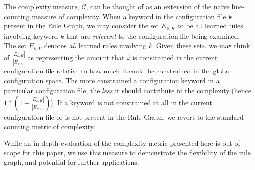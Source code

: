 
The complexity measure, $\mathcal{C}$, can be thought of as an
extension of the na\"ive line-counting measure of complexity.
When a keyword in the configuration file is present in the Rule Graph,
we may consider the set $E_{k, K}$ to be all learned rules involving
keyword $k$ that
are {\it relevant} to the configuration file being examined. 
The set $E_{k, V}$ denotes {\it all} learned rules involving $k$.
Given these sets, we may think of $\frac{|E_{k, K}|}{|E_{k, V}|}$
as representing the amount that $k$ is constrained in the current
configuration file relative to how much it could be constrained
in the global configuration space. The more constrained a configuration
keyword in a particular configuration file, the {\it less} it should
contribute to the complexity (hence $1 * (1 - \frac{|E_{k, K}|}{|E_{k, V}|})$).
If a keyword is not constrained at all in the current configuration
file or is not present in the Rule Graph, we revert to the standard
counting metric of complexity. 

While an in-depth evaluation of the complexity metric presented here
is out of scope for this paper, we use this measure to
demonstrate the flexibility of the rule graph, and potential
for further applications.

